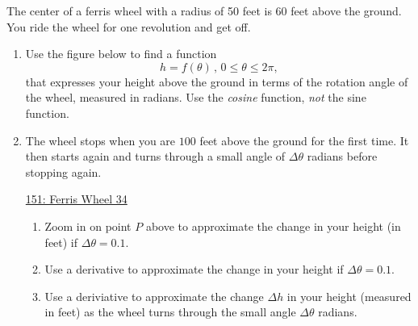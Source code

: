 \documentclass{ximera}
\begin{document}
\begin{question}  \label{Qd5t65yy6yuu}
The center of a ferris wheel with a radius of 50 feet is 60 feet above the ground. You ride the wheel for one revolution and get off.

\begin{enumerate}

\item Use the figure below to find a function 
\[
 h = f(\theta) \, , \, 0\leq \theta \leq 2\pi ,
\] 
that expresses your height above the ground in terms of the rotation angle of the wheel, measured in radians. Use the \emph{cosine} function, \emph{not} the sine function.


\begin{onlineOnly}
    \begin{center}
\end{center}
\end{onlineOnly}


\item The wheel stops when you are $100$ feet above the ground for the first time. It then starts again and turns through a small angle of $\Delta \theta$ radians before stopping again.


\begin{onlineOnly}
    \begin{center}
\end{center}
\end{onlineOnly}

\href{https://www.desmos.com/calculator/7mmcytoxg8}{151: Ferris Wheel 34}


\begin{enumerate}

\item Zoom in on point $P$ above to approximate the change in your height (in feet) if $\Delta \theta = 0.1$.

\item Use a derivative to approximate the change in your height if $\Delta \theta = 0.1$.

\item Use a deriviative to approximate the change $\Delta h$ in your height (measured in feet) as the wheel turns through the small angle $\Delta \theta$ radians.

\end{enumerate}
\end{enumerate}
\end{question}
\end{document}
